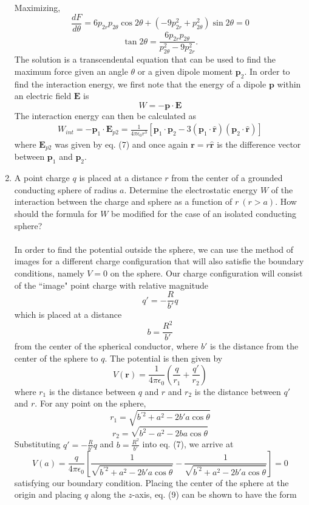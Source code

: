 \documentclass[11pt,letterpaper]{article}
\newcommand{\vect}[1]{\mathbf{#1}}
\begin{document}
\begin{enumerate}
Maximizing,
$$\frac{dF}{d\theta}= 6p_{2r}p_{2\theta}\cos{2 \theta} + (-9p_{2r}^2 + p_{2\theta}^2) \sin{2 \theta}=0$$
$$\tan{2\theta} = \frac{6p_{2r}p_{2\theta}}{p_{2\theta}^2-9p_{2r}^2}.$$
The solution is a transcendental equation that can be used to find the maximum force given an angle $\theta$ or a given dipole moment $\vect p_2$. In order to find  the interaction energy, we first note that the energy of a dipole $\vect p$ within an electric field $\vect E$ is
$$W = -\vect p\cdot\vect E$$
The interaction energy can then be calculated as
\begin{align*}W_{int} = -\vect p_1\cdot \vect E_{p2}=\frac{1}{4\pi\epsilon_0r^3}[\vect p_1\cdot\vect p_2-3(\vect p_1\cdot\hat{\vect r})(\vect p_2\cdot\hat{\vect r})]\end{align*}
where $\vect E_{p2}$ was given by eq. (7) and once again $\vect r = r\hat{\vect r}$ is the difference vector between $\vect p_1$ and $\vect p_2$.
\item A point charge $q$ is placed at a distance $r$ from the center of a grounded conducting sphere of radius $a$. Determine the electrostatic energy $W$ of the interaction between the charge and sphere as a function of $r\ (r>a)$. How should the formula for $W$ be modified for the case of an isolated conducting sphere?
\\ \\In order to find the potential outside the sphere, we can use the method of images for a different charge configuration that will also satisfie the boundary conditions, namely $V=0$ on the sphere. Our charge configuration will consist of the ``image" point charge with relative magnitude
$$q'=-\frac{R}{b'}q$$
which is placed at a distance 
$$b=\frac{R^2}{b'}$$ from the center of the spherical conductor, where $b'$ is the distance from the center of the sphere to $q$. The potential is then given by
\begin{equation}V(\vect r) = \frac{1}{4\pi\epsilon_0}\left(\frac{q}{r_1}+\frac{q'}{r_2}\right)\end{equation}
where $r_1$ is the distance between $q$ and $r$ and $r_2$ is the distance between $q'$ and $r$. For any point on the sphere,
$$r_1 = \sqrt{b^{'2}+a^2-2b'a\cos\theta}$$
$$r_2 =\sqrt{b^2-a^2-2ba\cos\theta}$$
Substituting $q'=-\frac{R}{b'}q$ and $b=\frac{R^2}{b'}$ into eq. (7), we arrive at 
$$V(a) = \frac{q}{4\pi\epsilon_0}\left[\frac{1}{\sqrt{b^{'2}+a^2-2b'a\cos\theta}}-\frac{1}{\sqrt{b^{'2}+a^2-2b'a\cos\theta}}\right] = 0$$
satisfying our boundary condition. Placing the center of the sphere at the origin and placing $q$ along the $z$-axis, eq. (9) can be shown to have the form 

\end{enumerate}
\end{document}
